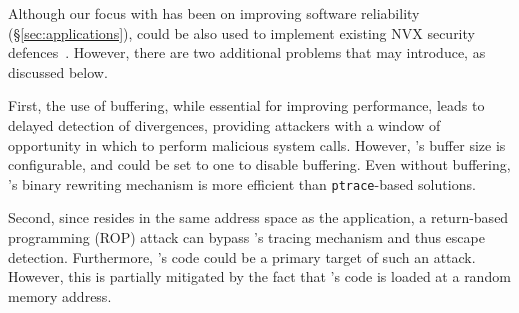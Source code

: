  Although our focus with \varan has been on
improving software reliability (\S\ref{sec:applications}), \varan
could be also used to implement existing NVX security
defences~\cite{cox2006,orchestra09}.  However, there are two
additional problems that \varan may introduce, as discussed below.  

First, the use of buffering, while essential for improving
performance, leads to delayed detection of divergences, providing
attackers with a window of opportunity in which to perform malicious
system calls.  However, \varan's buffer size is configurable, and
could be set to one to disable buffering. Even without buffering,
\varan's binary rewriting mechanism is more efficient than
\lstinline`ptrace`-based solutions.

Second, since \varan resides in the same address space as the
application, a return-based programming (ROP) attack can bypass
\varan's tracing mechanism and thus escape detection.  Furthermore,
\varan's code could be a primary target of such an attack. However,
this is partially mitigated by the fact that \varan's code is loaded
at a random memory address.
